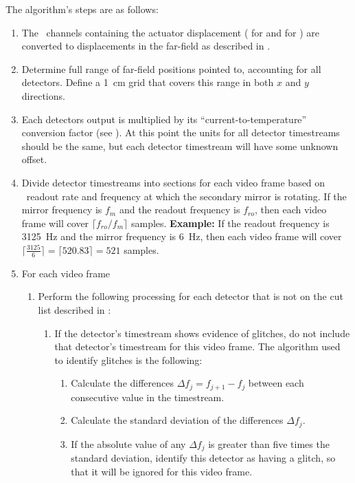 The algorithm's steps are as follows:
\begin{enumerate}
\item The  \MCE\ channels containing the actuator displacement ( for  and  for ) are converted to displacements in the far-field as described in .
\item Determine full range of far-field positions pointed to, accounting for all detectors. Define a \SI{1}{\cm} grid that covers this range in both $x$ and $y$ directions.
\item Each detectors output is multiplied by its ``current-to-temperature'' conversion factor (see ). At this point the units for all detector timestreams should be the same, but each detector timestream will have some unknown offset.
\item Divide detector timestreams into sections for each video frame based on \MCE\ readout rate and frequency at which the secondary mirror is rotating.
  If the mirror frequency is $f_m$ and the readout frequency is $f_{ro}$, then each video frame will cover $\lceil f_{ro} / f_{m} \rceil$ samples.
  \textbf{Example:} If the readout frequency is \SI{3125}{\Hz} and the mirror frequency is \SI{6}{\Hz}, then each video frame will cover $\lceil\frac{3125}{6}\rceil = \lceil 520.83 \rceil = 521$ samples.
\item For each video frame
  \begin{enumerate}
  \item Perform the following processing for each detector that is not on the cut list described in :
    \begin{enumerate}
    \item If the detector's timestream shows evidence of glitches, do not include that detector's timestream for this video frame. The algorithm used to identify glitches is the following:
      \begin{enumerate}
      \item Calculate the differences $\Delta f_j = f_{j+1} - f_j$ between each consecutive value in the timestream.
      \item Calculate the standard deviation of the differences $\Delta f_j$.
      \item If the absolute value of any $\Delta f_j$ is greater than five times the standard deviation, identify this detector as having a glitch, so that it will be ignored for this video frame.

\end{enumerate}
\end{enumerate}
\end{enumerate}
\end{enumerate}

